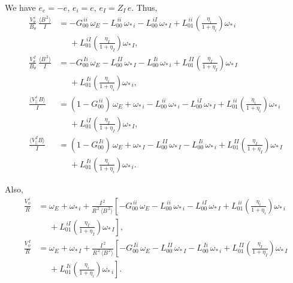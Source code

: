 \documentclass[notitlepage,12pt]{article}
\begin{document}
We have $e_e=-e$, $e_i=e$, $e_I= Z_I\,e$. 
Thus,
\begin{align}\label{vtnc}
\frac{V_\theta^{\,i}}{B_\theta}\,\frac{\langle B^{\,2}\rangle}{I} &= -G_{00}^{\,ii}\,\omega_E-L^{\,ii}_{00}\,\omega_{\ast\,i}-
L^{\,iI}_{00}\,\omega_{\ast\,I}+L^{\,ii}_{01}\left(\frac{\eta_i}{1+\eta_i}\right)\omega_{\ast\,i}\nonumber\\[0.5ex]\phantom{=}
&\phantom{=}+L^{\,iI}_{01}\left(\frac{\eta_I}{1+\eta_I}\right)\omega_{\ast\,I},\\[0.5ex]
\frac{V_\theta^{\,I}}{B_\theta}\,\frac{\langle B^{\,2}\rangle}{I} &= -G_{00}^{\,Ii}\,\omega_E-L^{\,II}_{00}\,\omega_{\ast\,I}-
L^{\,Ii}_{00}\,\omega_{\ast\,i}+L^{\,II}_{01}\left(\frac{\eta_I}{1+\eta_I}\right)\omega_{\ast\,I}\nonumber\\[0.5ex]\phantom{=}
&\phantom{=}+L^{\,Ii}_{01}\left(\frac{\eta_i}{1+\eta_i}\right)\omega_{\ast\,i},\\[0.5ex]
\frac{\langle V_\parallel^{\,i}\,B\rangle}{I} &=(1-G_{00}^{\,ii})\,\omega_E +\omega_{\ast\,i}-L^{\,ii}_{00}\,\omega_{\ast\,i}-
L^{\,iI}_{00}\,\omega_{\ast\,I}+L^{\,ii}_{01}\left(\frac{\eta_i}{1+\eta_i}\right)\omega_{\ast\,i}\nonumber\\[0.5ex]\phantom{=}
&\phantom{=}+L^{\,iI}_{01}\left(\frac{\eta_I}{1+\eta_I}\right)\omega_{\ast\,I},\\[0.5ex]
\frac{\langle V_\parallel^{\,I} B\rangle}{I} &=(1-G_{00}^{\,Ii})\, \omega_E +\omega_{\ast\,I}-L^{\,II}_{00}\,\omega_{\ast\,I}-
L^{\,Ii}_{00}\,\omega_{\ast\,i}+L^{\,II}_{01}\left(\frac{\eta_I}{1+\eta_I}\right)\omega_{\ast\,I}\nonumber\\[0.5ex]\phantom{=}
&\phantom{=}+L^{\,Ii}_{01}\left(\frac{\eta_i}{1+\eta_i}\right)\omega_{\ast\,i}.
\end{align}

Also,
\begin{align}
\frac{V_\phi^{\,i}}{R}&=\omega_E +\omega_{\ast\,i} +\frac{I^{\,2}}{R^{\,2}\,\langle B^{\,2}\rangle}\left[-G_{00}^{\,ii}\,\omega_E-L^{\,ii}_{00}\,\omega_{\ast\,i}-
L^{\,iI}_{00}\,\omega_{\ast\,I}+L^{\,ii}_{01}\left(\frac{\eta_i}{1+\eta_i}\right)\omega_{\ast\,i}\right.\nonumber\\[0.5ex]\phantom{=}
&\left.\phantom{=}+L^{\,iI}_{01}\left(\frac{\eta_I}{1+\eta_I}\right)\omega_{\ast\,I}\right],\\[0.5ex]
\frac{V_\phi^{\,I}}{R}&= \omega_E +\omega_{\ast\,I}+\frac{I^{\,2}}{R^{\,2}\,\langle B^{\,2}\rangle}\left[-G_{00}^{\,Ii}\,\omega_E-L^{\,II}_{00}\,\omega_{\ast\,I}-
L^{\,Ii}_{00}\,\omega_{\ast\,i}+L^{\,II}_{01}\left(\frac{\eta_I}{1+\eta_I}\right)\omega_{\ast\,I}\right.\nonumber\\[0.5ex]\phantom{=}
&\left.\phantom{=}+L^{\,Ii}_{01}\left(\frac{\eta_i}{1+\eta_i}\right)\omega_{\ast\,i}\right].
\end{align}
\end{document}
